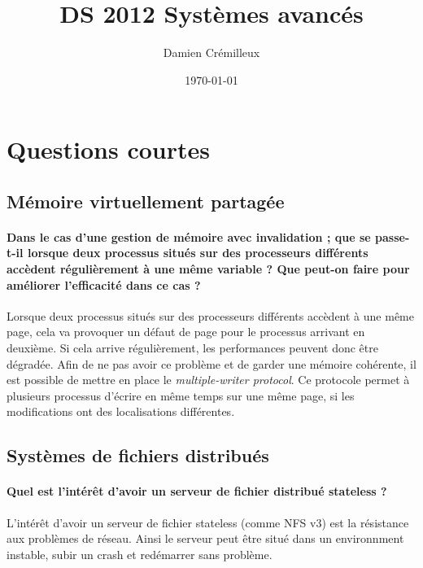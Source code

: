 \documentclass[a4paper]{article}
\begin{document}
\title{DS 2012 Systèmes avancés}
\author{Damien Crémilleux}
\date{\today}

\maketitle

\section{Questions courtes}

\subsection{Mémoire virtuellement partagée}

\paragraph{Dans le cas d'une gestion de mémoire avec invalidation ; que se passe-t-il lorsque deux processus situés sur des processeurs différents accèdent régulièrement à une même variable ? Que peut-on faire pour améliorer l'efficacité dans ce cas ?}
Lorsque deux processus situés sur des processeurs différents accèdent à une même page, cela va provoquer un défaut de page pour le processus arrivant en deuxième. Si cela arrive régulièrement, les performances peuvent donc être dégradée. Afin de ne pas avoir ce problème et de garder une mémoire cohérente, il est possible de mettre en place le \textit{multiple-writer protocol}. Ce protocole permet à plusieurs processus d'écrire en même temps sur une même page, si les modifications ont des localisations différentes.

\subsection{Systèmes de fichiers distribués}

\paragraph{Quel est l'intérêt d'avoir un serveur de fichier distribué stateless ?}
L'intérêt d'avoir un serveur de fichier stateless (comme NFS v3) est la résistance aux problèmes de réseau. Ainsi le serveur peut être situé dans un environnment instable, subir un crash et redémarrer sans problème.
\end{document}
